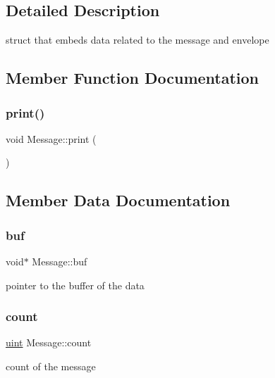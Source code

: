 \subsection{Detailed Description}
struct that embeds data related to the message and envelope 

\subsection{Member Function Documentation}
\mbox{\label{structMessage_a9d9fb4752c49738110413a6c2c02ab2d}} 
\subsubsection{\texorpdfstring{print()}{print()}}
{\footnotesize\ttfamily void Message\+::print (\begin{DoxyParamCaption}{ }\end{DoxyParamCaption})\hspace{0.3cm}{\ttfamily [inline]}}



\subsection{Member Data Documentation}
\mbox{\label{structMessage_abb937f76a19076be9c3ba4349db00707}} 
\subsubsection{\texorpdfstring{buf}{buf}}
{\footnotesize\ttfamily void$\ast$ Message\+::buf}

pointer to the buffer of the data \mbox{\label{structMessage_a66dd9a1c2793e7f4f5718b40eaa8f99a}} 
\subsubsection{\texorpdfstring{count}{count}}
{\footnotesize\ttfamily \mbox{\hyperlink{definitions_8h_a69aa29b598b851b0640aa225a9e5d61d}{uint}} Message\+::count}

count of the message \mbox{\label{structMessage_a5b21bf981f0142f06d9b3193d1505057}} 
